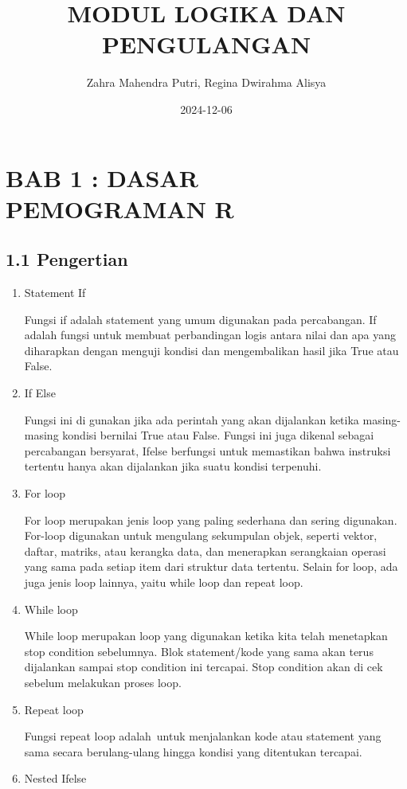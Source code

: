 \documentclass[
]{article}
\title{MODUL LOGIKA DAN PENGULANGAN}
\author{Zahra Mahendra Putri, Regina Dwirahma Alisya}
\date{2024-12-06}
\begin{document}
\maketitle

\section{BAB 1 : DASAR PEMOGRAMAN R}\label{bab-1-dasar-pemograman-r}

\subsection{1.1 Pengertian}\label{pengertian}

\begin{enumerate}
\def\labelenumi{\arabic{enumi}.}
\item
  Statement If

  Fungsi if adalah statement yang umum digunakan pada percabangan. If
  adalah fungsi untuk membuat perbandingan logis antara nilai dan apa
  yang diharapkan dengan menguji kondisi dan mengembalikan hasil jika
  True atau False.
\item
  If Else

  Fungsi ini di gunakan jika ada perintah yang akan dijalankan ketika
  masing-masing kondisi bernilai True atau False. Fungsi ini juga
  dikenal sebagai percabangan bersyarat, Ifelse berfungsi untuk
  memastikan bahwa instruksi tertentu hanya akan dijalankan jika suatu
  kondisi terpenuhi.
\item
  For loop

  For loop merupakan jenis loop yang paling sederhana dan sering
  digunakan. For-loop digunakan untuk mengulang sekumpulan objek,
  seperti vektor, daftar, matriks, atau kerangka data, dan menerapkan
  serangkaian operasi yang sama pada setiap item dari struktur data
  tertentu. Selain for loop, ada juga jenis loop lainnya, yaitu while
  loop dan repeat loop.
\item
  While loop

  While loop merupakan loop yang digunakan ketika kita telah menetapkan
  stop condition sebelumnya. Blok statement/kode yang sama akan terus
  dijalankan sampai stop condition ini tercapai. Stop condition akan di
  cek sebelum melakukan proses loop.
\item
  Repeat loop

  Fungsi repeat loop adalah~untuk menjalankan kode atau statement yang
  sama secara berulang-ulang hingga kondisi yang ditentukan tercapai.
\item
  Nested Ifelse


\end{enumerate}
\end{document}
